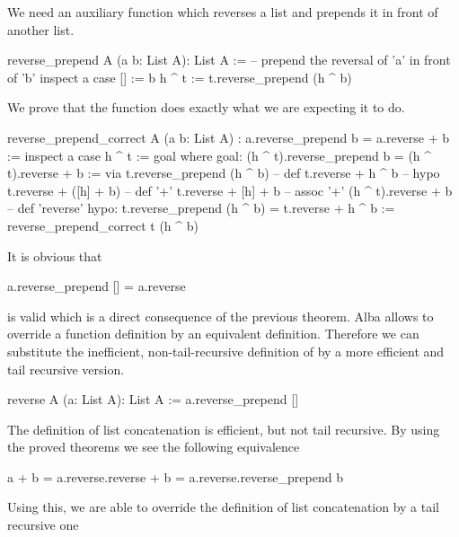 We need an auxiliary function which reverses a list and prepends it in front
of another list.

\begin{alba}
  reverse_prepend A (a b: List A): List A :=
      -- prepend the reversal of 'a' in front of 'b'
    inspect
      a
    case
      [] :=
        b
      h ^ t :=
        t.reverse_prepend (h ^ b)
\end{alba}


We prove that the function does exactly what we are expecting it to do.

\begin{alba}
  reverse_prepend_correct
    A (a b: List A)
    : a.reverse_prepend b = a.reverse + b :=
      inspect a case
        h ^ t :=
          goal where
            goal: (h ^ t).reverse_prepend  b = (h ^ t).reverse + b :=
              via
                t.reverse_prepend (h ^ b)            -- def
                t.reverse + h ^ b                    -- hypo
                t.reverse + ([h] + b)                -- def '+'
                t.reverse + [h] + b                  -- assoc '+'
                (h ^ t).reverse + b                  -- def 'reverse'
             hypo: t.reverse_prepend (h ^ b) = t.reverse + h ^ b :=
               reverse_prepend_correct t (h ^ b)
\end{alba}


It is obvious that
%
\begin{alba}
  a.reverse_prepend [] = a.reverse
\end{alba}
%
is valid which is a direct consequence of the previous theorem. Alba allows to
override a function definition by an equivalent definition. Therefore we can
substitute the inefficient, non-tail-recursive definition of  by
a more efficient and tail recursive version.

\begin{alba}
  reverse A (a: List A): List A :=
    a.reverse_prepend []
\end{alba}

The definition of list concatenation is efficient, but not tail recursive. By
using the proved theorems we see the following equivalence
%
\begin{alba}
  a + b   =  a.reverse.reverse + b
          =  a.reverse.reverse_prepend b
\end{alba}

Using this, we are able to override the definition of list concatenation by a
tail recursive one

